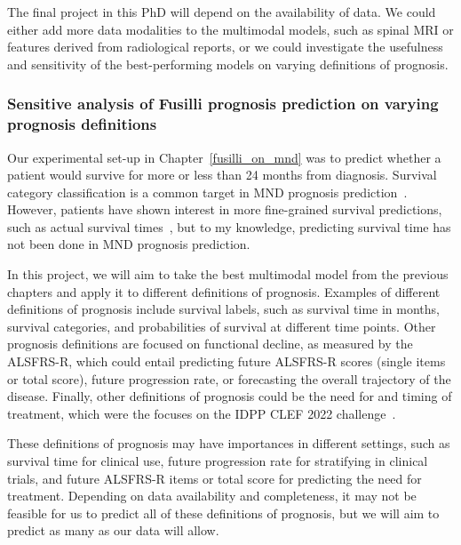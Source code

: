 The final project in this PhD will depend on the availability of data.
We could either add more data modalities to the multimodal models, such as spinal MRI or features derived from radiological reports, or we could investigate the usefulness and sensitivity of the best-performing models on varying definitions of prognosis.

\subsubsection*{Sensitive analysis of Fusilli prognosis prediction on varying prognosis definitions}

Our experimental set-up in Chapter~\ref{fusilli_on_mnd} was to predict whether a patient would survive for more or less than 24 months from diagnosis.
Survival category classification is a common target in MND prognosis prediction~\cite{ongPredictingFunctionalDecline2017,grollemundDevelopmentValidation1year2020, schusterSurvivalPredictionAmyotrophic2017, vanderburghDeepLearningPredictions2017}.
However, patients have shown interest in more fine-grained survival predictions, such as actual survival times~\cite{westenengPrognosisAmyotrophicLateral2018}, but to my knowledge, predicting survival time has not been done in MND prognosis prediction.

In this project, we will aim to take the best multimodal model from the previous chapters and apply it to different definitions of prognosis.
Examples of different definitions of prognosis include survival labels, such as survival time in months, survival categories, and probabilities of survival at different time points.
Other prognosis definitions are focused on functional decline, as measured by the ALSFRS-R, which could entail predicting future ALSFRS-R scores (single items or total score), future progression rate, or forecasting the overall trajectory of the disease.
Finally, other definitions of prognosis could be the need for and timing of treatment, which were the focuses on the IDPP CLEF 2022 challenge~\cite{guazzoOverviewIDPPCLEF2022}.

These definitions of prognosis may have importances in different settings, such as survival time for clinical use, future progression rate for stratifying in clinical trials, and future ALSFRS-R items or total score for predicting the need for treatment.
Depending on data availability and completeness, it may not be feasible for us to predict all of these definitions of prognosis, but we will aim to predict as many as our data will allow.

